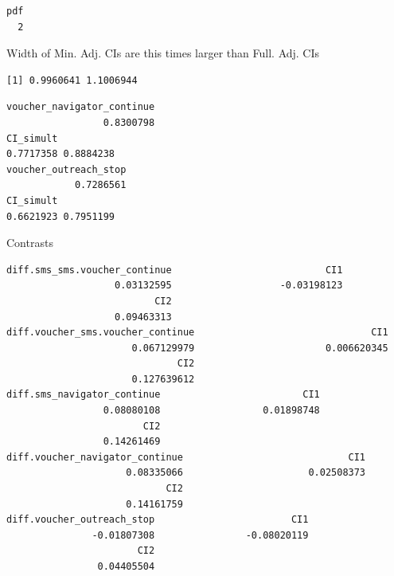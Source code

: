 \documentclass[11pt]{article}\usepackage[]{graphicx}\usepackage[]{color}
\makeatletter
\newenvironment{kframe}{%
 \def\at@end@of@kframe{}%
 \ifinner\ifhmode%
  \def\at@end@of@kframe{\end{minipage}}%
  \begin{minipage}{\columnwidth}%
 \fi\fi%
 \def\FrameCommand##1{\hskip\@totalleftmargin \hskip-\fboxsep
 \colorbox{shadecolor}{##1}\hskip-\fboxsep
     \hskip-\linewidth \hskip-\@totalleftmargin \hskip\columnwidth}%
 \MakeFramed {\advance\hsize-\width
   \@totalleftmargin\z@ \linewidth\hsize
   \@setminipage}}%
 {\par\unskip\endMakeFramed%
 \at@end@of@kframe}
\newenvironment{knitrout}{}{} %
\makeatother
\begin{document}
\begin{knitrout}
\begin{kframe}\begin{verbatim}
pdf 
  2 
\end{verbatim}
\end{kframe}
\end{knitrout}

Width of Min. Adj. CIs are this times larger than Full. Adj. CIs
\begin{knitrout}
\color{fgcolor}\begin{kframe}
\begin{verbatim}
[1] 0.9960641 1.1006944
\end{verbatim}
\end{kframe}
\end{knitrout}

\begin{knitrout}
\color{fgcolor}\begin{kframe}
\begin{verbatim}
voucher_navigator_continue 
                 0.8300798 
CI_simult           
0.7717358 0.8884238 
voucher_outreach_stop 
            0.7286561 
CI_simult           
0.6621923 0.7951199 
\end{verbatim}
\end{kframe}
\end{knitrout}

Contrasts
\begin{knitrout}
\color{fgcolor}\begin{kframe}
\begin{verbatim}
diff.sms_sms.voucher_continue                           CI1 
                   0.03132595                   -0.03198123 
                          CI2 
                   0.09463313 
diff.voucher_sms.voucher_continue                               CI1 
                      0.067129979                       0.006620345 
                              CI2 
                      0.127639612 
diff.sms_navigator_continue                         CI1 
                 0.08080108                  0.01898748 
                        CI2 
                 0.14261469 
diff.voucher_navigator_continue                             CI1 
                     0.08335066                      0.02508373 
                            CI2 
                     0.14161759 
diff.voucher_outreach_stop                        CI1 
               -0.01807308                -0.08020119 
                       CI2 
                0.04405504 
\end{verbatim}
\end{kframe}
\end{knitrout}
\end{document}
